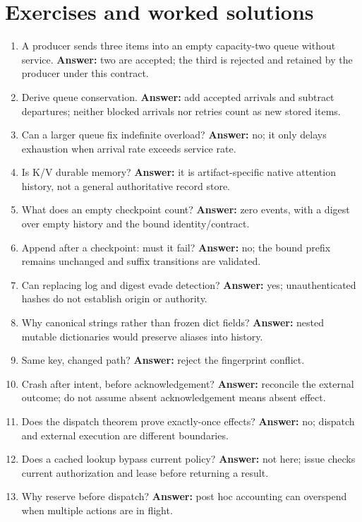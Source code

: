 \section{Exercises and worked solutions}
\begin{enumerate}
\item A producer sends three items into an empty capacity-two queue without
service. \textbf{Answer:} two are accepted; the third is rejected and retained
by the producer under this contract.
\item Derive queue conservation. \textbf{Answer:} add accepted arrivals and
subtract departures; neither blocked arrivals nor retries count as new stored items.
\item Can a larger queue fix indefinite overload? \textbf{Answer:} no; it only
delays exhaustion when arrival rate exceeds service rate.
\item Is K/V durable memory? \textbf{Answer:} it is artifact-specific native
attention history, not a general authoritative record store.
\item What does an empty checkpoint count? \textbf{Answer:} zero events,
with a digest over empty history and the bound identity/contract.
\item Append after a checkpoint: must it fail? \textbf{Answer:} no; the bound
prefix remains unchanged and suffix transitions are validated.
\item Can replacing log and digest evade detection? \textbf{Answer:} yes;
unauthenticated hashes do not establish origin or authority.
\item Why canonical strings rather than frozen dict fields? \textbf{Answer:}
nested mutable dictionaries would preserve aliases into history.
\item Same key, changed path? \textbf{Answer:} reject the fingerprint conflict.
\item Crash after intent, before acknowledgement? \textbf{Answer:} reconcile
the external outcome; do not assume absent acknowledgement means absent effect.
\item Does the dispatch theorem prove exactly-once effects? \textbf{Answer:}
no; dispatch and external execution are different boundaries.
\item Does a cached lookup bypass current policy? \textbf{Answer:} not here;
issue checks current authorization and lease before returning a result.
\item Why reserve before dispatch? \textbf{Answer:} post hoc accounting can
overspend when multiple actions are in flight.

\end{enumerate}
